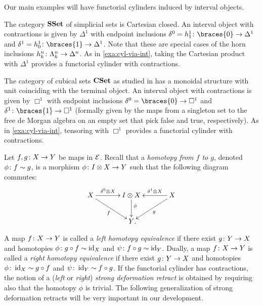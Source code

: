 \documentclass[reqno,10pt,a4paper,oneside,draft]{amsart}
\begin{document}
Our main examples will have functorial cylinders induced by interval objects.

\begin{example} \label{exa:cyl-in-sset}
The category $\mathbf{SSet}$ of simplicial sets is Cartesian closed.
An interval object with contractions is given by $\Delta^1$ with endpoint inclusions $\lcyl = h_1^1 \co \braces{0} \to \Delta^1$ and $\rcyl = h_0^1 \co \braces{1} \to \Delta^1$.
Note that these are special cases of the horn inclusions $h_k^n \colon \Lambda_k^n \to \Delta^n$.
As in \cref{exa:cyl-via-int}, taking the Cartesian product with $\Delta^1$ provides a functorial cylinder with contractions.
\end{example}

\begin{example} \label{exa:cyl-in-cuset}
The category of cubical sets $\mathbf{CSet}$ as studied in \cite{cohen-et-al:cubicaltt} has a monoidal structure with unit coinciding with the terminal object.
An interval object with contractions is given by $\Box^1$ with endpoint inclusions $\lcyl = \braces{0} \to \Box^1$ and $\rcyl \co \braces{1} \to \Box^1$ (formally given by the maps from a singleton set to the free de Morgan algebra on an empty set that pick false and true, respectively).
As in \cref{exa:cyl-via-int}, tensoring with $\Box^1$ provides a functorial cylinder with contractions.
\end{example}

Let $f, g \colon X \to Y$ be maps in $\mathcal{E}$.
Recall that a \emph{homotopy from $f$ to $g$}, denoted $\phi \colon f \sim g$, is a morphism $\phi \colon I \otimes X \to Y$ such that the following diagram commutes:
\begin{equation}
\label{equ:homotopy}
\begin{gathered}
\xymatrix@C=1.2cm{
  X
  \ar[r]^-{\lcyl \otimes X}
  \ar[dr]_{f}
&
  \interval \otimes X
  \ar[d]^(0.4){\phi}
&
  X
  \ar[dl]^{g}
  \ar[l]_-{\rcyl \otimes X}
\\&
  Y
\rlap{.}}
\end{gathered}
\end{equation}

A map $f \colon X \to Y$ is called a \emph{left homotopy equivalence} if there exist $g \colon Y \to X$ and homotopies $\phi \colon g \mathbin{\circ} f \sim \operatorname{id}_X $ and $\psi \colon f \mathbin{\circ} g \sim \operatorname{id}_Y$.
Dually, a map $f \colon X \to Y$ is called a \emph{right homotopy equivalence} if there exist $g \colon Y \to X$ and homotopies $\phi \colon \operatorname{id}_X \sim g \mathbin{\circ} f$ and $\psi \colon \operatorname{id}_Y \sim f \mathbin{\circ} g$.
If the functorial cylinder has contractions, the notion of a (\emph{left} or \emph{right}) \emph{strong deformation retract} is obtained by requiring also that the homotopy $\phi$ is trivial.
The following generalization of strong deformation retracts will be very important in our development.
\end{document}
